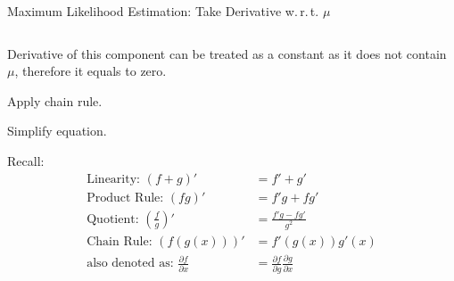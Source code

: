 \begin{frame}{Maximum Likelihood Estimation: Take Derivative w.\,r.\,t. $\mu$}
\begin{columns}
\begin{column}{0.5\textwidth}
			\begin{enumerate}
				{
				\item Derivative of this component can be treated as a constant as it does not contain $\mu$, therefore it equals to zero.
				\item Apply chain rule.
				\item Simplify equation.
				      }
			\end{enumerate}
			\vspace*{1em}
			{
				\footnotesize
				Recall:
				\vspace*{-1em}
				\begin{align*}
					\text{Linearity: } (f+g)'                                        & = f' + g'                                                                       \\
					\text{Product Rule: } (fg)'                                      & = f'g + fg'                                                                     \\
					\text{Quotient: } \left(\textstyle\frac{f}{g}\right)'            & =\textstyle\frac{f'g-fg'}{g^2}                                                  \\
					\text{Chain Rule: } (f(g(x)))'                                   & =f'(g(x))g'(x)                                                                  \\
					\text{also denoted as: } \textstyle\frac{\partial f}{\partial x} & =\textstyle\frac{\partial f}{\partial g}\textstyle\frac{\partial g}{\partial x}
				\end{align*}
			}
		\end{column}
	\end{columns}
\end{frame}

